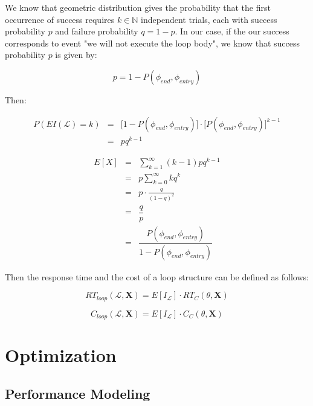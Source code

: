 \documentclass[12pt,a4paper]{report}
\newcommand*{\N}{\mathbb{N}}
\theoremstyle{definition}
\begin{document}
We know that geometric distribution gives the probability that the first occurrence of success requires $k \in \N$ independent trials, each with success probability $p$ and failure probability $q = 1 - p$. In our case, if the our success corresponds to event "we will not execute the loop body", we know that success probability $p$ is given by:

\begin{equation}
	p = 1 - P(\phi_{end}, \phi_{entry})
\end{equation}

Then:

\begin{eqnarray}
	P(EI(\mathcal{L}) = k) & = & \Big[  1 - P(\phi_{end}, \phi_{entry}) \Big] \cdot \bigg[  P(\phi_{end}, \phi_{entry}) \bigg] ^{k-1} \\
	& = & pq^{k-1}
\end{eqnarray}

\begin{eqnarray}
	E[X] & = & \sum_{k = 1}^\infty (k-1) pq^{k-1} \nonumber \\
	& = & p \sum_{k = 0}^\infty kq^{k} \nonumber \\
	& = & p \cdot \frac{q}{(1-q)^2} \nonumber \\
	& = & \dfrac{q}{p} \nonumber \\
	& = & \dfrac{P(\phi_{end}, \phi_{entry})}{1 - P(\phi_{end}, \phi_{entry})} 
\end{eqnarray}

Then the response time and the cost of a loop structure can be defined as follows:

\begin{equation}
	RT_{loop}(\mathcal{L}, \textbf{X}) = E[I_{\mathcal{L}}] \cdot RT_C(\theta, \textbf{X})
\end{equation}

\begin{equation}
	C_{loop}(\mathcal{L}, \textbf{X}) = E[I_{\mathcal{L}}] \cdot C_C(\theta, \textbf{X})
\end{equation}




\section{Optimization}


\subsection{Performance Modeling}
\end{document}
